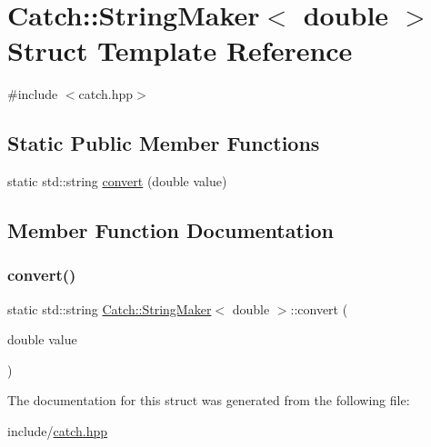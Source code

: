 \hypertarget{structCatch_1_1StringMaker_3_01double_01_4}{}\section{Catch\+:\+:String\+Maker$<$ double $>$ Struct Template Reference}
\label{structCatch_1_1StringMaker_3_01double_01_4}


{\ttfamily \#include $<$catch.\+hpp$>$}

\subsection*{Static Public Member Functions}
\begin{DoxyCompactItemize}
\item 
static std\+::string \mbox{\hyperlink{structCatch_1_1StringMaker_3_01double_01_4_acaa61529acad2462292c747d34e5f3d2}{convert}} (double value)
\end{DoxyCompactItemize}


\subsection{Member Function Documentation}
\mbox{\label{structCatch_1_1StringMaker_3_01double_01_4_acaa61529acad2462292c747d34e5f3d2}} 
\subsubsection{\texorpdfstring{convert()}{convert()}}
{\footnotesize\ttfamily static std\+::string \mbox{\hyperlink{structCatch_1_1StringMaker}{Catch\+::\+String\+Maker}}$<$ double $>$\+::convert (\begin{DoxyParamCaption}\item[{double}]{value }\end{DoxyParamCaption})\hspace{0.3cm}{\ttfamily [static]}}



The documentation for this struct was generated from the following file\+:\begin{DoxyCompactItemize}
\item 
include/\mbox{\hyperlink{catch_8hpp}{catch.\+hpp}}\end{DoxyCompactItemize}
